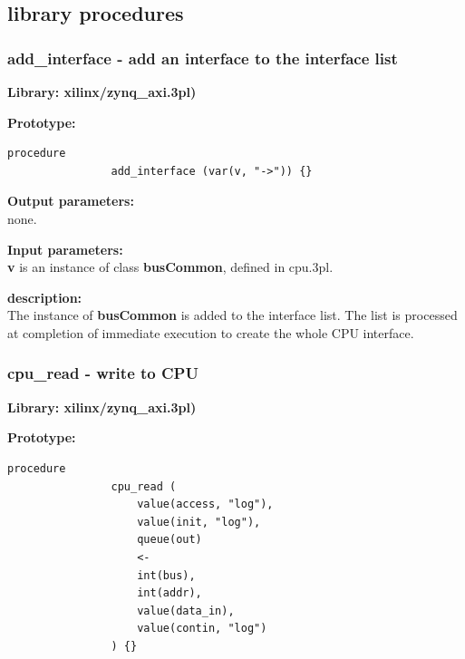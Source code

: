     
    \subsection{library procedures}

                                           
            


        \subsubsection{add\_interface - add an interface to the interface list}\label{sec:lpzynqcpuai}

            {\bf Library: xilinx/zynq\_axi.3pl)}

            {\bf Prototype:} \\
            \vsp
            \begin{lstlisting}[gobble=12, language=threepl]
                procedure
                add_interface (var(v, "->")) {}
            \end{lstlisting}
            
            {\bf Output parameters:} \\
            
                none.
                       
            {\bf Input parameters:} \\
            {\bf v} is an instance of class {\bf busCommon}, defined in
            cpu.3pl.
                     
            {\bf description:} \\
            The instance of {\bf busCommon} is added to the interface list.
            The list is processed at completion of immediate execution to
            create the whole CPU interface.




        \subsubsection{cpu\_read - write to CPU}\label{sec:lpzynqcpurd}

            {\bf Library: xilinx/zynq\_axi.3pl)}

            {\bf Prototype:} \\
            \vsp
            \begin{lstlisting}[gobble=12, language=threepl]
                procedure
                cpu_read (
                    value(access, "log"),
                    value(init, "log"), 
                    queue(out)
                    <-
                    int(bus),
                    int(addr),
                    value(data_in),
                    value(contin, "log")
                ) {}
            \end{lstlisting}
            
